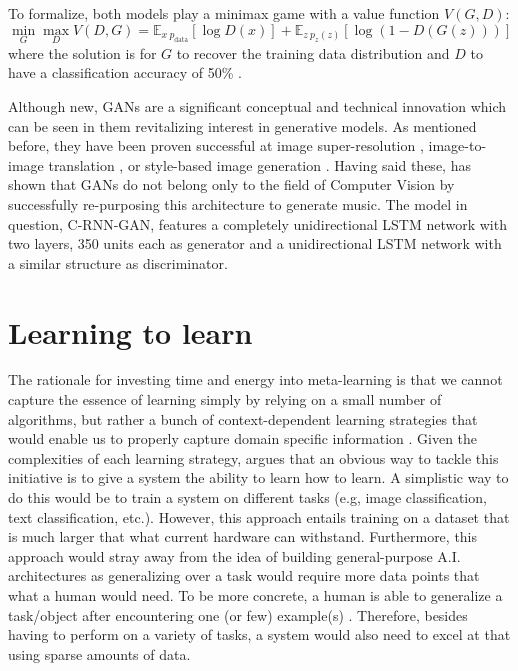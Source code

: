 \documentclass[a4paper]{book}
\begin{document}
To formalize, both models play a minimax game with a value function $V(G, D)$:
\begin{equation}
    \min_G \max_D V(D, G) = \mathbb{E}_{x ~ p_{\text{data}}} [ \log D(x) ] + \mathbb{E}_{z ~ p_z (z)} [ \log (1-D(G(z))) ]
\end{equation}
where the solution is for $G$ to recover the training data distribution and $D$ to have a classification accuracy of 50\% \parencite{goodfellow_generative_2014}.

Although new, GANs are a significant conceptual and technical innovation \parencite{briot_deep_2017} which can be seen in them revitalizing interest in generative models. As mentioned before, they have been proven successful at image super-resolution \parencite{ledig_photo-realistic_2016}, image-to-image translation \parencite{isola_image--image_2016}, or style-based image generation \parencite{karras_style-based_2018}. Having said these, \textcite{mogren_c-rnn-gan_2016} has shown that GANs do not belong only to the field of Computer Vision by successfully re-purposing this architecture to generate music. The model in question, C-RNN-GAN, features a completely unidirectional LSTM network with two layers, 350 units each as generator and a unidirectional LSTM network with a similar structure as discriminator.

\section{Learning to learn} \label{sec:learn2learn}

The rationale for investing time and energy into meta-learning is that we cannot capture the essence of learning simply by relying on a small number of algorithms, but rather a bunch of context-dependent learning strategies that would enable us to properly capture domain specific information \parencite{schmidhuber_evolutionary_1987}. Given the complexities of each learning strategy, \textcite{schmidhuber_evolutionary_1987} argues that an obvious way to tackle this initiative is to give a system the ability to learn how to learn. A simplistic way to do this would be to train a system on different tasks (e.g, image classification, text classification, etc.). However, this approach entails training on a dataset that is much larger that what current hardware can withstand. Furthermore, this approach would stray away from the idea of building general-purpose A.I. architectures as generalizing over a task would require more data points that what a human would need. To be more concrete, a human is able to generalize a task/object after encountering one (or few) example(s) \parencite{ravi_optimization_2016, chen_closer_2018}. Therefore, besides having to perform on a variety of tasks, a system would also need to excel at that using sparse amounts of data.
\end{document}

